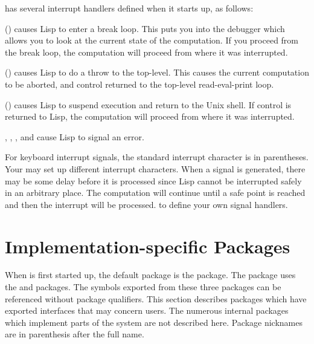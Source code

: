 \cmucl{} has several interrupt handlers defined when it starts up,
as follows:
\begin{Lentry}
  
\item[\code{SIGINT} (\ctrl{c})] causes Lisp to enter a break loop.
  This puts you into the debugger which allows you to look at the
  current state of the computation.  If you proceed from the break
  loop, the computation will proceed from where it was interrupted.
  
\item[\code{SIGQUIT} (\ctrl{L})] causes Lisp to do a throw to the
  top-level.  This causes the current computation to be aborted, and
  control returned to the top-level read-eval-print loop.
  
\item[\code{SIGTSTP} (\ctrl{z})] causes Lisp to suspend execution and
  return to the Unix shell.  If control is returned to Lisp, the
  computation will proceed from where it was interrupted.
  
\item[\code{SIGILL}, \code{SIGBUS}, \code{SIGSEGV}, and \code{SIGFPE}]
  cause Lisp to signal an error.
\end{Lentry}
For keyboard interrupt signals, the standard interrupt character is in
parentheses.  Your  may set up different interrupt
characters.  When a signal is generated, there may be some delay before
it is processed since Lisp cannot be interrupted safely in an arbitrary
place.  The computation will continue until a safe point is reached and
then the interrupt will be processed.   to define
your own signal handlers.


\section{Implementation-specific Packages}

When \cmucl{} is first started up, the default package is the
 package. The  package
uses the  and  packages. The
symbols exported from these three packages can be referenced without
package qualifiers. This section describes packages which have
exported interfaces that may concern users. The numerous internal
packages which implement parts of the system are not described here.
Package nicknames are in parenthesis after the full name.

